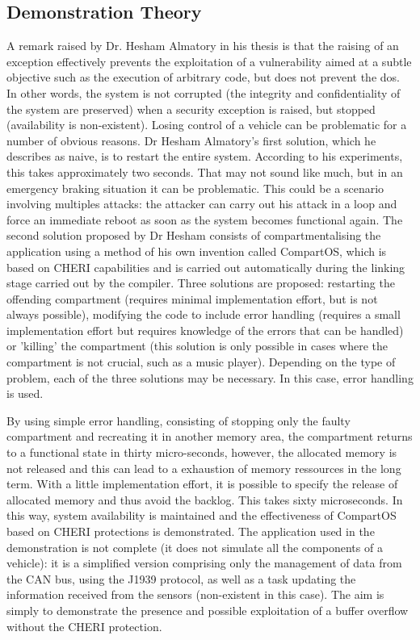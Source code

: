 \documentclass[a4paper, 11pt]{article}
\begin{document}
\subsection{Demonstration Theory}
A remark raised by Dr. Hesham Almatory in his thesis \cite{almatary2022compartos} is that the raising of an exception effectively prevents the exploitation of a vulnerability aimed at a subtle objective such as the execution of arbitrary code, but does not prevent the \Gls{dos}.
In other words, the system is not corrupted (the integrity and confidentiality of the system are preserved) when a security exception is raised, but stopped (availability is non-existent). Losing control of a vehicle can be problematic for a number of obvious reasons. Dr Hesham Almatory's first solution, which he describes as naive, is to restart the entire system. According to his experiments, this takes approximately two seconds. That may not sound like much, but in an emergency braking situation it can be problematic. This could be a scenario involving multiples attacks: the attacker can carry out his attack in a loop and force an immediate reboot as soon as the system becomes functional again. 
The second solution proposed by Dr Hesham consists of compartmentalising the application using a method of his own invention called CompartOS, which is based on CHERI capabilities and is carried out automatically during the linking stage carried out by the compiler. Three solutions are proposed: restarting the offending compartment (requires minimal implementation effort, but is not always possible), modifying the code to include error handling (requires a small implementation effort but requires knowledge of the errors that can be handled) or 'killing' the compartment (this solution is only possible in cases where the compartment is not crucial, such as a music player). Depending on the type of problem, each of the three solutions may be necessary. In this case, error handling is used.

By using simple error handling, consisting of stopping only the faulty compartment and recreating it in another memory area, the compartment returns to a functional state in thirty micro-seconds, however, the allocated memory is not released and this can lead to a exhaustion of memory ressources in the long term. With a little implementation effort, it is possible to specify the release of allocated memory and thus avoid the backlog. This takes sixty microseconds. In this way, system availability is maintained and the effectiveness of CompartOS based on CHERI protections is demonstrated.
The application used in the demonstration is not complete (it does not simulate all the components of a vehicle): it is a simplified version comprising only the management of data from the CAN bus, using the J1939 protocol, as well as a task updating the information received from the sensors (non-existent in this case). The aim is simply to demonstrate the presence and possible exploitation of a buffer overflow without the CHERI protection.
\end{document}
